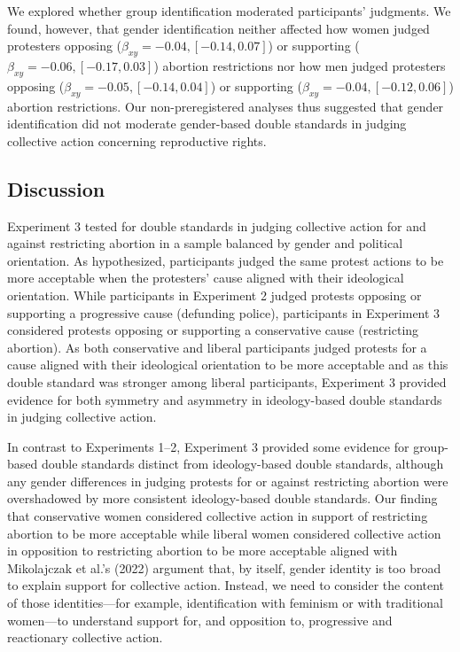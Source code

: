 \documentclass[12pt, letterpaper]{article}
\begin{document}
We explored whether group identification moderated participants'
judgments. We found, however, that gender identification neither
affected how women judged protesters opposing
(\(\beta_{xy} = -0.04, [-0.14, 0.07]\)) or supporting
(\(\beta_{xy} = -0.06, [-0.17, 0.03]\)) abortion restrictions nor how
men judged protesters opposing (\(\beta_{xy} = -0.05, [-0.14, 0.04]\))
or supporting (\(\beta_{xy} = -0.04, [-0.12, 0.06]\)) abortion
restrictions. Our non-preregistered analyses thus suggested that gender
identification did not moderate gender-based double standards in judging
collective action concerning reproductive rights.

\hypertarget{discussion-2}{%
\subsection{Discussion}\label{discussion-2}}

Experiment 3 tested for double standards in judging collective action
for and against restricting abortion in a sample balanced by gender and
political orientation. As hypothesized, participants judged the same
protest actions to be more acceptable when the protesters' cause aligned
with their ideological orientation. While participants in Experiment 2
judged protests opposing or supporting a progressive cause (defunding
police), participants in Experiment 3 considered protests opposing or
supporting a conservative cause (restricting abortion). As both
conservative and liberal participants judged protests for a cause
aligned with their ideological orientation to be more acceptable and as
this double standard was stronger among liberal participants, Experiment
3 provided evidence for both symmetry and asymmetry in ideology-based
double standards in judging collective action.

In contrast to Experiments 1--2, Experiment 3 provided some evidence for
group-based double standards distinct from ideology-based double
standards, although any gender differences in judging protests for or
against restricting abortion were overshadowed by more consistent
ideology-based double standards. Our finding that conservative women
considered collective action in support of restricting abortion to be
more acceptable while liberal women considered collective action in
opposition to restricting abortion to be more acceptable aligned with
Mikolajczak et al.'s (2022) argument that, by itself, gender identity is
too broad to explain support for collective action. Instead, we need to
consider the content of those identities---for example, identification
with feminism or with traditional women---to understand support for, and
opposition to, progressive and reactionary collective action.
\end{document}
